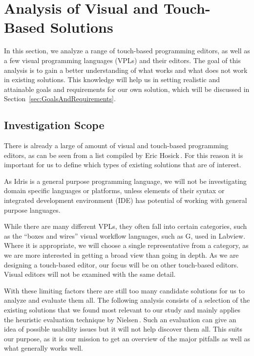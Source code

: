 \section{Analysis of Visual and Touch-Based Solutions}
\label{sec:Analysis}
In this section, we analyze a range of touch-based programming editors, as well as a few visual programming languages (VPLs) and their editors.
The goal of this analysis is to gain a better understanding of what works and what does not work in existing solutions.
This knowledge will help us in setting realistic and attainable goals and requirements for our own solution, which will be discussed in Section~\ref{sec:GoalsAndRequirements}.

\subsection{Investigation Scope}
There is already a large of amount of visual and touch-based programming editors, as can be seen from a list compiled by Eric Hosick\,\cite{hosick2014}.
For this reason it is important for us to define which types of existing solutions that are of interest.

As Idris is a general purpose programming language, we will not be investigating domain specific languages or platforms, unless elements of their syntax or integrated development environment (IDE) has potential of working with general purpose languages.

While there are many different VPLs, they often fall into certain categories, such as the ``boxes and wires'' visual workflow languages, such as G, used in Labview.
Where it is appropriate, we will choose a single representative from a category, as we are more interested in getting a broad view than going in depth.
As we are designing a touch-based editor, our focus will be on other touch-based editors. Visual editors will not be examined with the same detail.

With these limiting factors there are still too many candidate solutions for us to analyze and evaluate them all. 
The following analysis consists of a selection of the existing solutions that we found most relevant to our study and mainly applies the heuristic evaluation technique by Nielsen\,\cite{nielsen1990heuristic}. 
Such an evaluation can give an idea of possible usability issues but it will not help discover them all. 
This suits our purpose, as it is our mission to get an overview of the major pitfalls as well as what generally works well.

